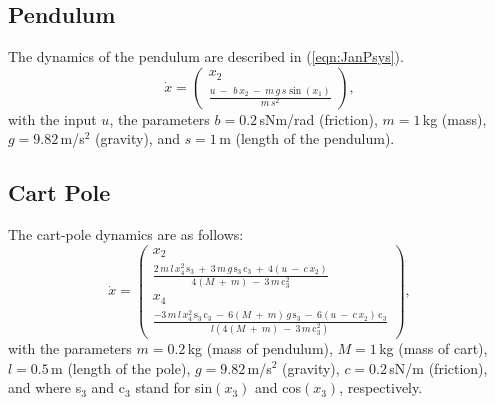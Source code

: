 \documentclass[letterpaper, 10 pt, conference]{ieeeconf}  %
\begin{document}
\subsection{Pendulum}
The dynamics of the pendulum are described in (\ref{eqn:JanPsys}).
\begin{equation}\label{eqn:JanPsys}
\dot{x}=
	\left( {\begin{array}{cc}
		x_2\\
		\tfrac{u \: - \: \,b\,x_2 \: - \: m\,g\,s\sin(x_1)}{m\,s^2}\end{array} } \right),
\end{equation}
with the input $u$, the parameters $b=0.2$\,sNm/rad (friction), $m=1$\,kg (mass), $g=9.82$\,m/s$^2$ (gravity), and $s=1$\,m (length of the pendulum).
\subsection{Cart Pole}
The cart-pole dynamics are as follows:
\begin{equation}\label{eqn:JanCPsys}
\dot{x}=
\left( {\begin{array}{cc}
	x_2\\
	\frac{2\,m\,l\,x_4^2\,\text{s}_3 \: + \: 3\,m\,g\,\text{s}_3\,\text{c}_3 \: + \: 4(u \: - \: c\,x_2)}{4(M \: + \: m) \: - \: 3\,m\,\text{c}_3^2}\\
	x_4\\
	\frac{-3\,m\,l\,x_4^2\,\text{s}_3\,\text{c}_3 \: - \: 6(M \: + \: m)\,g\,\text{s}_3 \: - \: 6(u \: - \: c\,x_2)\,\text{c}_3}{l(4(M \: + \: m) \: - \: 3\,m\,\text{c}_3^2)}\end{array} } \right),
\end{equation}
with the parameters $m=0.2$\,kg (mass of pendulum),  $M=1$\,kg (mass of cart), $l=0.5$\,m (length of the pole), $g=9.82$\,m/s$^2$ (gravity), $c=0.2$\,sN/m (friction), and where s$_3$ and c$_3$ stand for sin$(x_3)$ and cos$(x_3)$, respectively.

\end{document}
